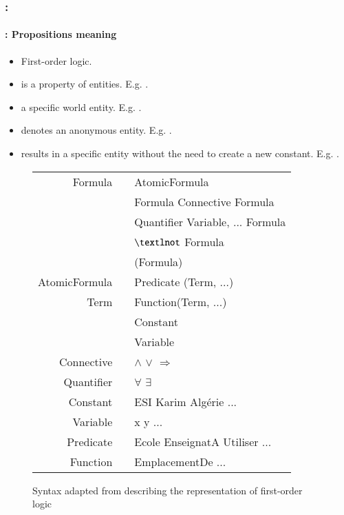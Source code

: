 \documentclass[xcolor=table]{beamer}
\begin{document}
\begin{frame}
	\frametitle{\insertshortsubtitle: \insertsection}
	\framesubtitle{\insertsubsection: Propositions meaning}

	\begin{minipage}{0.5\textwidth}
	\begin{itemize}
		\item First-order logic.
		\item {} is a property of entities. 
		E.g. .	
		\item {} a specific world entity.
		E.g. .
		\item {} denotes an anonymous entity. 
		E.g. .
		\item {} results in a specific entity without the need to create a new constant.
		E.g. .
	\end{itemize}
	\end{minipage}
	\begin{minipage}{0.48\textwidth}
		\begin{figure}
			{\tiny\bfseries
			\begin{tabular}{rcl}
				\hline\hline
				Formula & \textrightarrow & AtomicFormula \\
				& \textbar        & Formula Connective Formula \\
				& \textbar        & Quantifier Variable, ... Formula \\
				& \textbar        & $\textlnot$ Formula \\
				& \textbar        & (Formula) \\
				AtomicFormula & \textrightarrow & Predicate (Term, ...) \\
				Term    & \textrightarrow & Function(Term, ...) \\
				& \textbar        & Constant \\
				& \textbar        & Variable \\
				Connective & \textrightarrow & $\wedge$ \textbar $\vee$ \textbar $\Rightarrow$ \\
				Quantifier & \textrightarrow & $\forall$ \textbar $\exists$ \\
				Constant & \textrightarrow & ESI \textbar Karim \textbar Algérie ...\\
				Variable & \textrightarrow & x \textbar y \textbar ... \\
				Predicate & \textrightarrow & Ecole \textbar EnseignatA \textbar Utiliser \textbar ... \\
				Function & \textrightarrow & EmplacementDe \textbar ... \\
				\hline\hline
			\end{tabular}
		}
			\caption{Syntax adapted from \cite{2002-russell-norvig} describing the representation of first-order logic \cite{2019-jurafsky-martin}}
		\end{figure}
	\end{minipage}

\end{frame}
\end{document}
